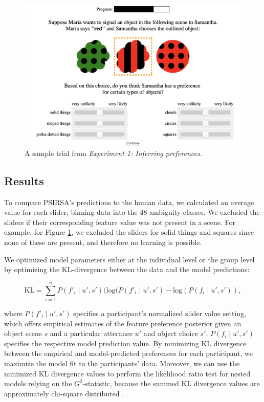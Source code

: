 \documentclass[10pt,a4paper]{article}
\newcommand{\gcs}[1]{\textcolor{blue}{[gcs: #1]}}
\begin{document}
\begin{figure}[ht!]
	\centering
	\includegraphics[width=4.5in]{images/preference-trial.png}
	\caption{A sample trial from \emph{Experiment 1: Inferring preferences}.}\label{exp1-trial}
\end{figure}

\subsection{Results}

To compare PSIRSA's predictions to the human data, we calculated an average value for each slider, binning data into the 48 ambiguity classes. We excluded the sliders if their corresponding feature value was not present in a scene. For example, for Figure \ref{exp1-trial}, we excluded the sliders for solid things and squares since none of these are present, and therefore no learning is possible.

We optimized model parameters either at the individual level or the group level by optimizing the KL-divergence between the data and the model predictions:

$$\textrm{KL} = \sum_{i=1}^{n} P(f'_i\mid u',s') (\textrm {log} (P(f'_i\mid u',s') - \textrm {log} (P(f_i\mid u',s')),$$

\noindent where $P(f'_i\mid u',s')$ specifies a participant's normalized slider value setting, which offers empirical estimates of the feature preference posterior given an object scene $s$ and a particular utterance $u'$ and object choice $s'$;
$P(f_i\mid u',s')$ specifies the respective model prediction value. 
By minimizing KL divergence between the empirical and model-predicted preferences for each participant, we maximize the model fit to the participants' data. 
Moreover, we can use the minimized KL divergence values to perform the likelihood ratio test for nested models relying on the $G^2$-statistic, because the summed KL divergence values are approximately chi-square distributed \cite{Lewandowsky:2011}. 
\end{document}

